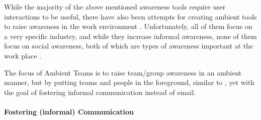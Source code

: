 While the majority of the above mentioned awareness tools require user interactions to be useful, there have also been attempts for creating ambient tools to raise awareness in the work environment \cite{morrison2020facilitating, otjacques2006ambient, downs2012ambient, alavi2012ambient}. Unfortunately, all of them focus on a very specific industry, and while they increase informal awareness, none of them focus on social awareness, both of which are types of awareness important at the work place \cite{greenberg1996awareness}.

The focus of Ambient Teams is to raise team/group awareness in an ambient manner, but by putting teams and people in the foreground, similar to \cite{whittaker2004contactmap}, yet with the goal of fostering informal communication instead of email. 
\\\\
\textbf{Fostering (informal) Communication} \\
